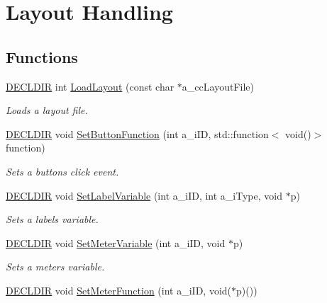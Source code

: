 \hypertarget{group___layouts}{\section{Layout Handling}
\label{group___layouts}
}
\subsection*{Functions}
\begin{DoxyCompactItemize}
\item 
\hyperlink{_framework_8h_a6b6635274dbcf57e29a0140cd8cf0305}{D\-E\-C\-L\-D\-I\-R} int \hyperlink{group___layouts_ga4bd47317d687a02300c0831001457cca}{Load\-Layout} (const char $\ast$a\-\_\-cc\-Layout\-File)
\begin{DoxyCompactList}\small\item\em Loads a layout file. \end{DoxyCompactList}\item 
\hyperlink{_framework_8h_a6b6635274dbcf57e29a0140cd8cf0305}{D\-E\-C\-L\-D\-I\-R} void \hyperlink{group___layouts_gacf9c1459b355fa299f3805ba951be57c}{Set\-Button\-Function} (int a\-\_\-i\-I\-D, std\-::function$<$ void()$>$ function)
\begin{DoxyCompactList}\small\item\em Sets a buttons click event. \end{DoxyCompactList}\item 
\hyperlink{_framework_8h_a6b6635274dbcf57e29a0140cd8cf0305}{D\-E\-C\-L\-D\-I\-R} void \hyperlink{group___layouts_ga8e125c0d79f1bfe0176a8fb11e28ab72}{Set\-Label\-Variable} (int a\-\_\-i\-I\-D, int a\-\_\-i\-Type, void $\ast$p)
\begin{DoxyCompactList}\small\item\em Sets a labels variable. \end{DoxyCompactList}\item 
\hyperlink{_framework_8h_a6b6635274dbcf57e29a0140cd8cf0305}{D\-E\-C\-L\-D\-I\-R} void \hyperlink{group___layouts_gacae2bde29f276c6c614b1d3c7d4089d7}{Set\-Meter\-Variable} (int a\-\_\-i\-I\-D, void $\ast$p)
\begin{DoxyCompactList}\small\item\em Sets a meters variable. \end{DoxyCompactList}\item 
\hyperlink{_framework_8h_a6b6635274dbcf57e29a0140cd8cf0305}{D\-E\-C\-L\-D\-I\-R} void \hyperlink{group___layouts_ga56ad270811b7083a1a51998845c8b442}{Set\-Meter\-Function} (int a\-\_\-i\-I\-D, void($\ast$p)())

\end{DoxyCompactItemize}
